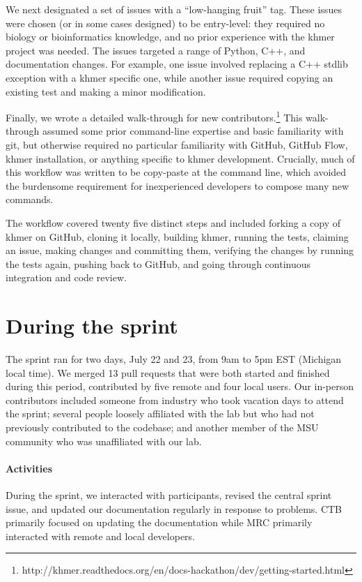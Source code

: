 \documentclass[11pt]{article}
\begin{document}
We next designated a set of issues with a ``low-hanging fruit'' tag.
These issues were chosen (or in some cases designed) to be
entry-level: they required no biology or bioinformatics knowledge, and
no prior experience with the khmer project was needed.  The issues
targeted a range of Python, C++, and documentation changes.  For
example, one issue involved replacing a C++ stdlib exception with a
khmer specific one, while another issue required copying an existing
test and making a minor modification.

Finally, we wrote a detailed walk-through for new contributors.\footnote{http://khmer.readthedocs.org/en/docs-hackathon/dev/getting-started.html}
This walk-through assumed some prior command-line expertise and basic
familiarity with git, but otherwise required no particular familiarity
with GitHub, GitHub Flow, khmer installation, or anything specific to
khmer development.  Crucially, much of this workflow was written to be
copy-paste at the command line, which avoided the burdensome
requirement for inexperienced developers to compose many new commands.

The workflow covered twenty five distinct steps and included forking a
copy of khmer on GitHub, cloning it locally, building khmer, running
the tests, claiming an issue, making changes and committing them,
verifying the changes by running the tests again, pushing back to
GitHub, and going through continuous integration and code review.

\section{During the sprint}

The sprint ran for two days, July 22 and 23, from 9am to 5pm EST
(Michigan local time).  We merged 13 pull requests that were both
started and finished during this period, contributed by five remote
and four local users.  Our in-person contributors included someone
from industry who took vacation days to attend the sprint; several
people loosely affiliated with the lab but who had not previously
contributed to the codebase; and another member of the MSU community
who was unaffiliated with our lab.

\paragraph{Activities}
During the sprint, we interacted with participants, revised the
central sprint issue, and updated our documentation regularly in
response to problems.  CTB primarily focused on updating the
documentation while MRC primarily interacted with remote and local
developers.
\end{document}
